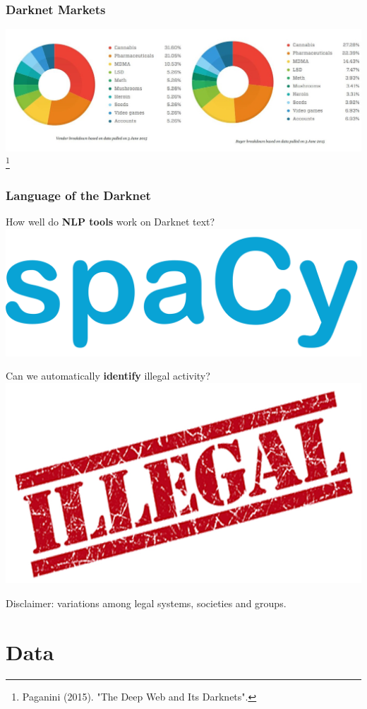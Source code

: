 \documentclass[t,xcolor={svgnames,table}]{beamer}
\begin{document}
\begin{frame}
	\frametitle{Darknet Markets}
	
	\includegraphics[trim={0 2cm 16cm 1cm},clip,width=\pagewidth]{DeepWeb-Black-markets-vendors-buyers.jpg}\footnote{Paganini (2015). "The Deep Web and Its Darknets".}
\end{frame}

\begin{frame}
	\frametitle{Language of the Darknet}
	
	\begin{center}
	How well do \textbf{NLP tools} work on Darknet text?
	\includegraphics[width=.4\textwidth]{spacy.png}
	\vfill
	\pause
	
	Can we automatically \textbf{identify} illegal activity?
	\includegraphics[width=.4\textwidth]{illegal.jpg}
	
	Disclaimer:
	variations among legal systems, societies and groups.
	\end{center}
\end{frame}

\section{Data}
\end{document}
